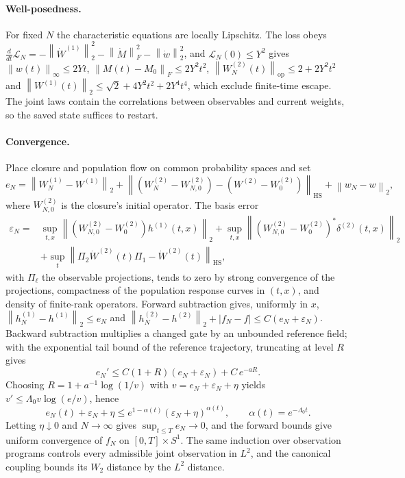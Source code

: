\documentclass[11pt]{article}
\theoremstyle{definition}
\theoremstyle{remark}
\newcommand{\cL}{\mathcal{L}}
\newcommand{\norm}[1]{\left\lVert #1\right\rVert}
\newcommand{\HS}{\mathrm{HS}}
\begin{document}
\paragraph{Well-posedness.}
For fixed $N$ the characteristic equations are locally Lipschitz.  The loss
obeys $\frac{d}{dt}\cL_N=-\norm{\dot W^{(1)}}_2^2-\norm{\dot M}_F^2-\norm{\dot w}_2^2$,
and $\cL_N(0)\le Y^2$ gives $\norm{w(t)}_\infty\le2Yt$,
$\norm{M(t)-M_0}_F\le2Y^2t^2$, $\norm{W^{(2)}_N(t)}_{\mathrm{op}}\le2+2Y^2t^2$ and
$\norm{W^{(1)}(t)}_2\le\sqrt2+4Y^2t^2+2Y^4t^4$, which exclude finite-time escape.
The joint laws contain the correlations between observables and current weights,
so the saved state suffices to restart.

\paragraph{Convergence.}
Place closure and population flow on common probability spaces and set
\[
 e_N=\norm{W^{(1)}_N-W^{(1)}}_2
 +\norm{(W^{(2)}_N-W^{(2)}_{N,0})-(W^{(2)}-W^{(2)}_0)}_\HS
 +\norm{w_N-w}_2 ,
\]
where $W^{(2)}_{N,0}$ is the closure's initial operator.  The basis error
\begin{align*}
 \varepsilon_N={}&\sup_{t,x}\norm{(W^{(2)}_{N,0}-W^{(2)}_0)h^{(1)}(t,x)}_2
 +\sup_{t,x}\norm{(W^{(2)}_{N,0}-W^{(2)}_0)^*\delta^{(2)}(t,x)}_2\\
 &+\sup_t\norm{\Pi_2\dot W^{(2)}(t)\Pi_1-\dot W^{(2)}(t)}_\HS,
\end{align*}
with $\Pi_\ell$ the observable projections, tends to zero by strong convergence
of the projections, compactness of the population response curves in $(t,x)$,
and density of finite-rank operators.  Forward subtraction gives, uniformly in
$x$, $\norm{h^{(1)}_N-h^{(1)}}_2\le e_N$ and
$\norm{h^{(2)}_N-h^{(2)}}_2+|f_N-f|\le C(e_N+\varepsilon_N)$.  Backward
subtraction multiplies a changed gate by an unbounded reference field; with the
exponential tail bound of the reference trajectory, truncating at level $R$
gives
\[
 e_N'\le C(1+R)(e_N+\varepsilon_N)+C\,e^{-aR}.
\]
Choosing $R=1+a^{-1}\log(1/v)$ with $v=e_N+\varepsilon_N+\eta$ yields
$v'\le \Lambda_0 v\log(e/v)$, hence
\[
 e_N(t)+\varepsilon_N+\eta\le e^{1-\alpha(t)}(\varepsilon_N+\eta)^{\alpha(t)},
 \qquad\alpha(t)=e^{-\Lambda_0 t}.
\]
Letting $\eta\downarrow0$ and $N\to\infty$ gives $\sup_{t\le T}e_N\to0$, and the
forward bounds give uniform convergence of $f_N$ on $[0,T]\times S^1$.  The same
induction over observation programs controls every admissible joint observation
in $L^2$, and the canonical coupling bounds its $W_2$ distance by the $L^2$
distance.
\end{document}
